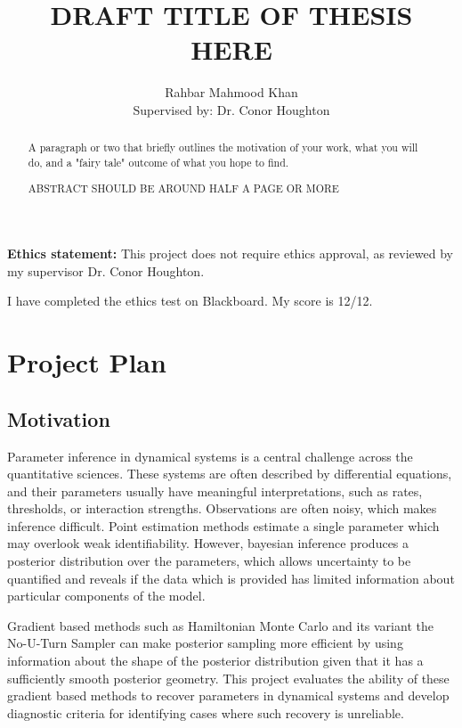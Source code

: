 \documentclass{article}
\title{DRAFT TITLE OF THESIS HERE}
\author{Rahbar Mahmood Khan \\ 
        Supervised by: Dr. Conor Houghton}
\begin{document}
\maketitle

\begin{abstract}
A paragraph or two that briefly outlines the motivation of your work, what you will do, and a "fairy tale" outcome of what you hope to find. 

\vspace{75mm} 

ABSTRACT SHOULD BE AROUND HALF A PAGE OR MORE
\end{abstract}

\textbf{Ethics statement: } This project
does not require ethics approval, as reviewed by my supervisor Dr. Conor Houghton.

I have completed the ethics test on Blackboard. My score is 12/12.

\newpage %

\section{Project Plan}

\subsection{Motivation}
Parameter inference in dynamical systems is a central challenge across the quantitative sciences. These systems are often described by differential equations, and their parameters usually have meaningful interpretations, such as rates, thresholds, or interaction strengths. Observations are often noisy, which makes inference difficult. Point estimation methods estimate a single parameter which may overlook weak identifiability. However, bayesian inference produces a posterior distribution over the parameters, which allows uncertainty to be quantified and reveals if the data which is provided has limited information about particular components of the model.

Gradient based methods such as Hamiltonian Monte Carlo and its variant the No-U-Turn Sampler can make posterior sampling more efficient by using information about the shape of the posterior distribution given that it has a sufficiently smooth posterior geometry. This project evaluates the ability of these gradient based methods to recover parameters in dynamical systems and develop diagnostic criteria for identifying cases where such recovery is unreliable.
\end{document}
